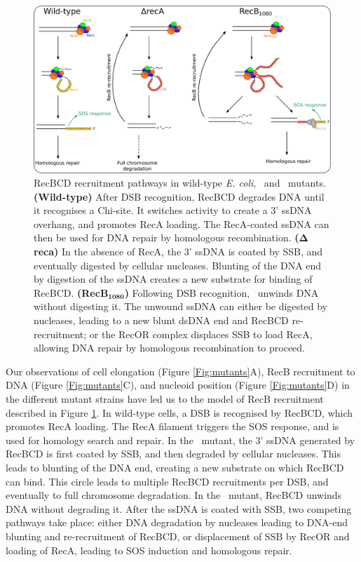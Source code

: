 \begin{figure}[htbp]
    \centering
    \includegraphics[width=\textwidth]{Figures/Fig_mutants_pathways.pdf}
    \caption{RecBCD recruitment pathways in wild-type \emph{E. coli}, \dreca\ and \teneighty\ mutants. \textbf{(Wild-type)} After DSB recognition, RecBCD degrades DNA until it recognises a Chi-site. It switches activity to create a 3' ssDNA overhang, and promotes RecA loading. The RecA-coated ssDNA can then be used for DNA repair by homologous recombination. \textbf{($\mathbf{\Delta}$reca)} In the absence of RecA, the 3' ssDNA is coated by SSB, and eventually digested by cellular nucleases. Blunting of the DNA end by digestion of the ssDNA creates a new substrate for binding of RecBCD. \textbf{(RecB$\mathbf{_{1080}}$)} Following DSB recognition, \teneighty\ unwinds DNA without digesting it. The unwound ssDNA can either be digested by nucleases, leading to a new blunt dsDNA end and RecBCD re-recruitment; or the RecOR complex displaces SSB to load RecA, allowing DNA repair by homologous recombination to proceed.}
    \label{Fig:pathways}
\end{figure}

Our observations of cell elongation (Figure \ref{Fig:mutants}A), RecB recruitment to DNA (Figure \ref{Fig:mutants}C), and nucleoid position (Figure \ref{Fig:mutants}D) in the different mutant strains have led us to the model of RecB recruitment described in Figure \ref{Fig:pathways}. In wild-type cells, a DSB is recognised by RecBCD, which promotes RecA loading. The RecA filament triggers the SOS response, and is used for homology search and repair. In the \dreca\ mutant, the 3' ssDNA generated by RecBCD is first coated by SSB, and then degraded by cellular nucleases. This leads to blunting of the DNA end, creating a new substrate on which RecBCD can bind. This circle leads to multiple RecBCD recruitments per DSB, and eventually to full chromosome degradation. In the \teneighty\ mutant, RecBCD unwinds DNA without degrading it. After the ssDNA is coated with SSB, two competing pathways take place: either DNA degradation by nucleases leading to DNA-end blunting and re-recruitment of RecBCD, or displacement of SSB by RecOR and loading of RecA, leading to SOS induction and homologous repair.
